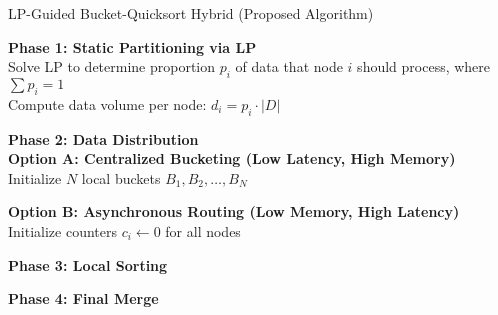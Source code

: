 \documentclass[]{interact}
\theoremstyle{plain}
\theoremstyle{definition}
\theoremstyle{remark}
\begin{document}
\begin{algorithm}[H]
\caption{LP-Guided Bucket-Quicksort Hybrid (Proposed Algorithm)}



\textbf{Phase 1: Static Partitioning via LP} \\
Solve LP to determine proportion $p_i$ of data that node $i$ should process, where $\sum p_i = 1$ \\
Compute data volume per node: $d_i = p_i \cdot |D|$

\textbf{Phase 2: Data Distribution} \\
\textbf{Option A: Centralized Bucketing (Low Latency, High Memory)} \\
Initialize $N$ local buckets $B_1, B_2, \ldots, B_N$ \\

\textbf{Option B: Asynchronous Routing (Low Memory, High Latency)} \\
Initialize counters $c_i \leftarrow 0$ for all nodes \\

\textbf{Phase 3: Local Sorting} \\

\textbf{Phase 4: Final Merge} \\


\end{algorithm}
\end{document}
